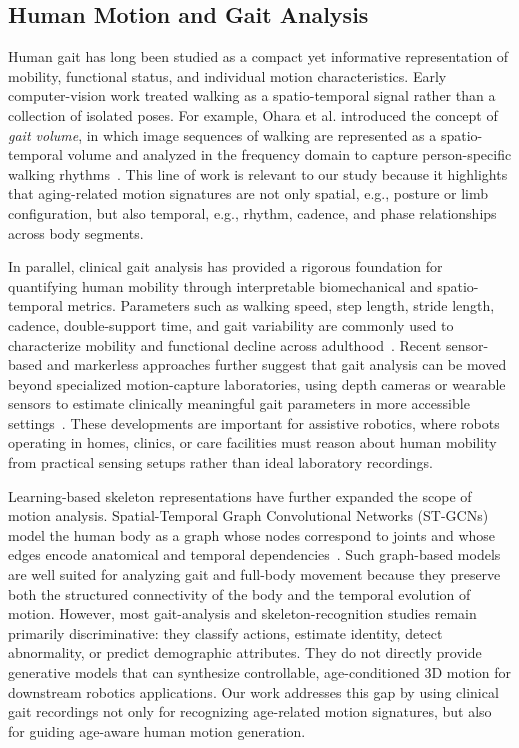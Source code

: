\subsection{Human Motion and Gait Analysis}

Human gait has long been studied as a compact yet informative representation of mobility, functional status, and individual motion characteristics.
Early computer-vision work treated walking as a spatio-temporal signal rather than a collection of isolated poses.
For example, Ohara et al. introduced the concept of \emph{gait volume}, in which image sequences of walking are represented as a spatio-temporal volume and analyzed in the frequency domain to capture person-specific walking rhythms~\cite{ohara2004gaitvolume}.
This line of work is relevant to our study because it highlights that aging-related motion signatures are not only spatial, e.g., posture or limb configuration, but also temporal, e.g., rhythm, cadence, and phase relationships across body segments.

In parallel, clinical gait analysis has provided a rigorous foundation for quantifying human mobility through interpretable biomechanical and spatio-temporal metrics.
Parameters such as walking speed, step length, stride length, cadence, double-support time, and gait variability are commonly used to characterize mobility and functional decline across adulthood~\cite{herssens2020investigation}.
Recent sensor-based and markerless approaches further suggest that gait analysis can be moved beyond specialized motion-capture laboratories, using depth cameras or wearable sensors to estimate clinically meaningful gait parameters in more accessible settings~\cite{wagner2023methods}.
These developments are important for assistive robotics, where robots operating in homes, clinics, or care facilities must reason about human mobility from practical sensing setups rather than ideal laboratory recordings.

Learning-based skeleton representations have further expanded the scope of motion analysis.
Spatial-Temporal Graph Convolutional Networks (ST-GCNs) model the human body as a graph whose nodes correspond to joints and whose edges encode anatomical and temporal dependencies~\cite{yan2018stgcn}.
Such graph-based models are well suited for analyzing gait and full-body movement because they preserve both the structured connectivity of the body and the temporal evolution of motion.
However, most gait-analysis and skeleton-recognition studies remain primarily discriminative: they classify actions, estimate identity, detect abnormality, or predict demographic attributes.
They do not directly provide generative models that can synthesize controllable, age-conditioned 3D motion for downstream robotics applications.
Our work addresses this gap by using clinical gait recordings not only for recognizing age-related motion signatures, but also for guiding age-aware human motion generation.


